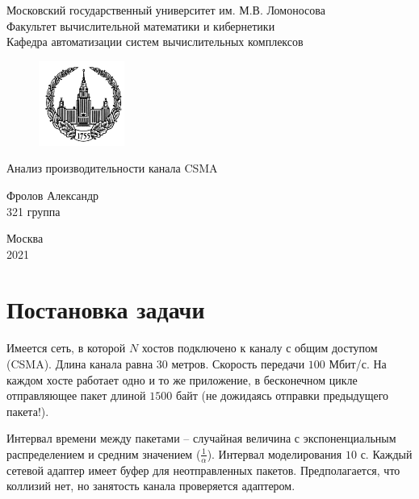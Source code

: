 \documentclass[a4paper, 14pt]{extarticle}
\begin{document}
\begin{titlepage}
\begin{center}
\large{Московский государственный университет им. М.В. Ломоносова}\\
\vspace{0.5cm}
\normalsize{Факультет вычислительной математики и кибернетики}\\
\vspace{0.25cm}
\normalsize{Кафедра автоматизации систем вычислительных комплексов}\\
\vspace{1.5cm}
\begin{figure}[h]
	\centering
	\includegraphics[width=0.25\textwidth]{logo}
\end{figure}
\vspace{3cm}
\huge{Анализ производительности канала CSMA}
\end{center}
\begin{flushright}
\vspace{4cm}
Фролов Александр\\
321 группа
\end{flushright}
\vspace{4cm}
\begin{center}
Москва\\
2021\\
\end{center}
\end{titlepage}
\thispagestyle{empty}
 
\newpage
\tableofcontents
\newpage

\newpage
\section{Постановка задачи}
Имеется сеть, в которой $N$ хостов подключено к каналу с общим доступом (CSMA).
Длина канала равна $30$ метров.
Скорость передачи $100$ Мбит/с.
На каждом хосте работает одно и то же приложение, в бесконечном цикле отправляющее пакет длиной $1500$ байт (не дожидаясь отправки предыдущего пакета!).

Интервал времени между пакетами – случайная величина с экспоненциальным распределением и средним значением ($\frac{1}{\alpha}$).
Интервал моделирования $10$ с.
Каждый сетевой адаптер имеет буфер для неотправленных пакетов.
Предполагается, что коллизий нет, но занятость канала проверяется адаптером.
\end{document}
